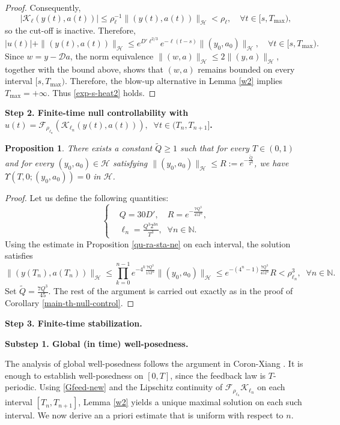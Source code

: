 \documentclass[a4paper]{article}
\newtheorem{proposition}[theorem]{Proposition}
\numberwithin{equation}{section}
\begin{document}
\begin{appendices}
\begin{proof}
Consequently,
$$|\mathcal K_\ell(y(t),a(t))|
\le \rho_\ell^{-1}\|(y(t),a(t))\|_{\mathcal H}
<\rho_\ell,\quad \forall t\in[s,T_{\max}),$$
so the cut-off is inactive. Therefore,
$$|u(t)|+\|(y(t),a(t))\|_{\mathcal H}
\le e^{D'\ell^{2/3}}e^{-\ell(t-s)}
\|(y_0,a_0)\|_{\mathcal H},\quad \forall t\in[s,T_{\max}).$$
Since $w=y-\mathcal Da$, the norm equivalence $\|(w,a)\|_{\mathcal H}\le 2\|(y,a)\|_{\mathcal H}$, together with the bound above, shows that $(w,a)$ remains bounded on every interval $[s,T_{\max})$. Therefore, the blow-up alternative in Lemma \ref{w2} implies $T_{\max}=+\infty$. Thus \eqref{exp-s-heat2} holds.
\end{proof}
\noindent \textbf{Step 2. Finite-time null controllability with $u(t)=\mathcal{F}_{\rho_{\ell_n}}(\mathcal{K}_{\ell_n}(y(t),a(t))),\;\;\forall t\in(T_n,T_{n+1}]$.}

\begin{proposition}\label{main-th-null-control-ne}
There exists a constant $\tilde{Q} \geq 1 $ such that for every $T \in (0,1)$ and for every $(y_0,a_0)\in\mathcal{H}$ satisfying $\|(y_0,a_0)\|_{\mathcal{H}}\leq R:=e^{-\frac{\tilde{Q}}{T^2}}$, we have $\Upsilon(T,0;(y_0,a_0))=0$ in $\mathcal{H}$.
\end{proposition}
\begin{proof}
 Let us define the following quantities:
\begin{equation*}
\left\{  \begin{aligned}
&Q=30D',\quad R = e^{-\frac{7Q^3}{45T^2}},\\
&\ell_n = \frac{Q^3  2^{3n}}{T^3},\;\;\forall n \in \mathbb{N}.            
\end{aligned}\right.
\end{equation*}
Using the estimate in Proposition \ref{qu-ra-sta-ne} on each interval, the solution satisfies
$$\|(y(T_n),a(T_n))\|_{\mathcal{H}}\le \prod_{k=0}^{n-1} e^{-4^k\frac{7Q^3}{15T^2}}  \|(y_0,a_0)\|_{\mathcal{H}}\le e^{-(4^n-1)\frac{7Q^3}{45T^2}}R<\rho_{\ell_{n}}^3,\;\;\forall n\in \mathbb{N}.$$
Set $\tilde{Q}=\frac{7Q^3}{45}$. The rest of the
argument is carried out exactly as in the proof of Corollary \ref{main-th-null-control}.
\end{proof}
\noindent \textbf{Step 3. Finite-time stabilization.}

\noindent \textbf{Substep 1. Global (in time) well-posedness.}

The analysis of global well-posedness follows the argument in Coron-Xiang \cite{CX}. It is enough to establish well-posedness on $[0,T]$, since the feedback law is $T$-periodic. Using \eqref{Gfeed-new} and the Lipschitz continuity of  $\mathcal{F}_{\rho_{\ell_n}}\mathcal{K}_{\ell_n}$ on each interval $[T_n,T_{n+1}]$, Lemma \ref{w2} yields a unique maximal solution on each such interval. We now derive an a priori estimate that is uniform with respect to $n$.


\end{appendices}
\end{document}
